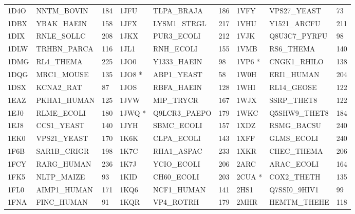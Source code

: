 \documentclass{bioinfo}
\begin{document}
\begin{table*}[!t]
{\begin{tabular}{lllllllll}
    1D4O   & NNTM\_BOVIN  & 184             & 1JFU   & TLPA\_BRAJA  & 186             & 1VFY   & VPS27\_YEAST & 73              \\
    1DBX   & YBAK\_HAEIN  & 158             & 1JFX   & LYSM1\_STRGL & 217             & 1VHU   & Y1521\_ARCFU & 211             \\
    1DIX   & RNLE\_SOLLC  & 208             & 1JKX   & PUR3\_ECOLI  & 212             & 1VJK   & Q8U3C7\_PYRFU & 98              \\
    1DLW   & TRHBN\_PARCA & 116             & 1JL1   & RNH\_ECOLI   & 155             & 1VMB   & RS6\_THEMA   & 140             \\
    1DMG   & RL4\_THEMA   & 225             & 1JO0   & Y1333\_HAEIN & 98              & 1VP6 *  & CNGK1\_RHILO & 138             \\
    1DQG   & MRC1\_MOUSE  & 135             & 1JO8 *  & ABP1\_YEAST  & 58              & 1W0H   & ERI1\_HUMAN  & 204             \\
    1DSX   & KCNA2\_RAT   & 87              & 1JOS   & RBFA\_HAEIN  & 128             & 1WHI   & RL14\_GEOSE  & 122             \\
    1EAZ   & PKHA1\_HUMAN & 125             & 1JVW   & MIP\_TRYCR   & 167             & 1WJX   & SSRP\_THET8  & 122             \\
    1EJ0   & RLME\_ECOLI  & 180             & 1JWQ *  & Q9LCR3\_PAEPO & 179             & 1WKC   & Q5SHW9\_THET8 & 184             \\
    1EJ8   & CCS1\_YEAST  & 140             & 1JYH   & SBMC\_ECOLI  & 157             & 1XDZ   & RSMG\_BACSU  & 240             \\
    1EK0   & VPS21\_YEAST & 170             & 1K6K   & CLPA\_ECOLI  & 143             & 1XFF   & GLMS\_ECOLI  & 240             \\
    1F6B   & SAR1B\_CRIGR & 198             & 1K7C   & RHA1\_ASPAC  & 233             & 1XKR   & CHEC\_THEMA  & 206             \\
    1FCY   & RARG\_HUMAN  & 236             & 1K7J   & YCIO\_ECOLI  & 206             & 2ARC   & ARAC\_ECOLI  & 164             \\
    1FK5   & NLTP\_MAIZE  & 93              & 1KID   & CH60\_ECOLI  & 203             & 2CUA *  & COX2\_THETH  & 135             \\
    1FL0   & AIMP1\_HUMAN & 171             & 1KQ6   & NCF1\_HUMAN  & 141             & 2HS1   & Q7SSI0\_9HIV1 & 99              \\
    1FNA   & FINC\_HUMAN  & 91              & 1KQR   & VP4\_ROTRH   & 179             & 2MHR   & HEMTM\_THEHE & 118             \\

\end{tabular}}
\end{table*}
\end{document}
